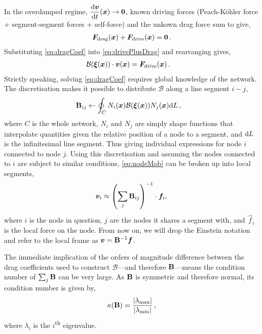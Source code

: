 In the overdamped regime, $\dfrac{\rvar{d}\vec{v}}{\rvar{d}t}(\vec{x}) \to \vec{0}$, known driving forces (Peach-K\"{o}hler force + segment-segment forces + self-force) and the unkown drag force sum to give,
\begin{align}\label{eq:drivePlusDrag}
    \vec{F}_\rvar{drag}(\vec{x}) + \vec{F}_\rvar{drive}(\vec{x}) = \vec{0}\,.
\end{align}
Substituting \cref{eq:dragCoef} into \cref{eq:drivePlusDrag} and rearranging gives,
\begin{align}\label{eq:nodeMob}
    \mathcal{B}(\vec{\xi}(\vec{x})) \cdot \vec{v}(\vec{x}) & = \vec{F}_\rvar{drive}(\vec{x})\,.
\end{align}
Strictly speaking, solving \cref{eq:dragCoef} requires global knowledge of the network. The discretisation makes it possible to distribute $\mathcal{B}$ along a line segment $i-j$,
\begin{align}\label{eq:dragMatrix}
    \mtx{B}_{ij} & \gets \oint_{C} N_i(\vec{x}) \mathcal{B}(\vec{\xi}(\vec{x})) N_j(\vec{x}) \rvar{d}L\,,
\end{align}
where $C$ is the whole network, $N_i$ and $N_j$ are simply shape functions that interpolate quantities given the relative position of a node to a segment, and $\textrm{d}L$ is the infinitesimal line segment. Thus giving individual expressions for node $i$ connected to node $j$. Using this discretisation and assuming the nodes connected to $i$ are subject to similar conditions, \cref{eq:nodeMob} can be broken up into local segments,
\begin{align}\label{eq:nodeVel}
    \vec{v}_i \approx \left(\sum\limits_j \mtx{B}_{ij}\right)^{-1} \cdot \vec{f}_i,\,
\end{align}
where $i$ is the node in question, $j$ are the nodes it shares a segment with, and $\vec{f}_i$ is the local force on the node. From now on, we will drop the Einstein notation and refer to the local frame as $\vec{v} = \mtx{B}^{-1} \vec{f}$.

The immediate implication of the orders of magnitude difference between the drag coefficients used to construct $\mathcal{B}$---and therefore $\mathbf{B}$---means the condition number of $\sum_j \mathbf{B}$ can be very large. As $\mathbf{B}$ is symmetric and therefore normal, its condition number is given by,
\begin{align}\label{eq:conditionNumb}
    \kappa(\mathbf{B}) = \dfrac{\lvert \lambda_{\textrm{max}} \rvert}{\lvert \lambda_{\textrm{min}} \rvert} \,,
\end{align}
where $\lambda_i$ is the $i$\textsuperscript{th} eigenvalue.


